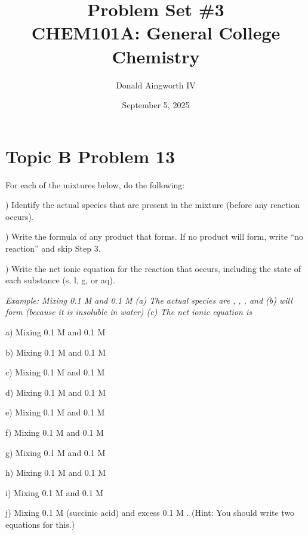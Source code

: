 \documentclass[10pt]{article}
\title{
    Problem Set \#3
    \\  \small
    CHEM101A: General College Chemistry
    }
\author{Donald Aingworth IV}
\date{September 5, 2025}
\begin{document}

    \maketitle

    \pagebreak
    \section{Topic B Problem 13}
        For each of the mixtures below, do the following:

        ) Identify the actual species that are present in the mixture (before any reaction occurs).
        
        ) Write the formula of any product that forms. If no product will form, write “no reaction” and skip Step 3.
        
        ) Write the net ionic equation for the reaction that occurs, including the state of each
        substance (s, l, g, or aq).

        \textit{
            Example: Mixing 0.1 M  and 0.1 M 
            (a) The actual species are , , , and 
            (b)  will form (because it is insoluble in water)
            (c) The net ionic equation is 
            }
        
        a) Mixing 0.1 M  and 0.1 M 
    
        b) Mixing 0.1 M  and 0.1 M 
    
        c) Mixing 0.1 M  and 0.1 M 
    
        d) Mixing 0.1 M  and 0.1 M 
    
        e) Mixing 0.1 M  and 0.1 M 
    
        f) Mixing 0.1 M  and 0.1 M 
    
        g) Mixing 0.1 M  and 0.1 M 
    
        h) Mixing 0.1 M  and 0.1 M 
    
        i) Mixing 0.1 M  and 0.1 M 
    
        j) Mixing 0.1 M  (succinic acid) and excess 0.1 M . (Hint: You should write two equations for this.)
\end{document}

